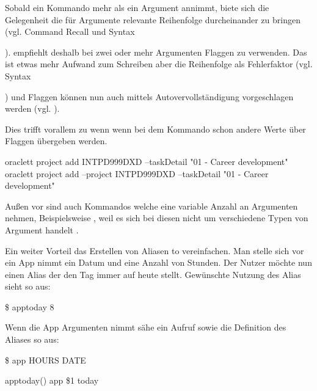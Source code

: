 \documentclass[oneside,bibliography=totocnumbered,BCOR=5mm]{scrbook}
\newenvironment{code}{\captionsetup{type=listing, skip=0pt}}{}
\begin{document}
Sobald ein Kommando mehr als ein Argument annimmt, biete sich die Gelegenheit
die für Argumente relevante Reihenfolge durcheinander zu bringen (vgl. Command
Recall und Syntax %

). \cite{12factor} empfiehlt deshalb bei zwei oder mehr Argumenten Flaggen zu
verwenden. Das ist etwas mehr Aufwand zum Schreiben aber die Reihenfolge als
Fehlerfaktor (vgl. Syntax

) und Flaggen können nun auch mittels Autovervollständigung vorgeschlagen werden
(vgl. ).


Dies trifft vorallem zu wenn wenn bei dem Kommando schon andere Werte über
Flaggen übergeben werden.

\begin{code}
  \begin{shellcode}
oraclett project add INTPD999DXD --taskDetail "01 - Career development"
oraclett project add --project INTPD999DXD --taskDetail "01 - Career development"
  \end{shellcode}
  \medskip
\end{code}

Außen vor sind auch Kommandos welche eine variable Anzahl an Argumenten nehmen,
Beispielsweise , weil es sich bei diesen nicht
um verschiedene Typen von Argument handelt \parencite{12factor}.

Ein weiter Vorteil das Erstellen von Aliasen to vereinfachen. Man stelle sich
vor ein App nimmt ein Datum und eine Anzahl von Stunden. Der Nutzer möchte nun
einen Alias der den Tag immer auf heute stellt. Gewünschte Nutzung des Alias sieht so aus:

\begin{code}
  \begin{shellcode}
\$ apptoday 8
  \end{shellcode}
\end{code}

Wenn die App Argumenten nimmt sähe ein Aufruf sowie die Definition des Aliases so aus:

\begin{code}
  \begin{shellcode}
\$ app HOURS DATE

apptoday() {
  app \$1 today
}
  \end{shellcode}
\end{code}
\end{document}

